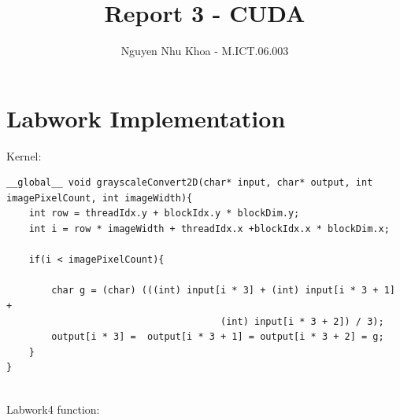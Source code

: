 \documentclass[a4paper,11pt, notitlepage]{article}
\begin{document}
\title{
\vspace{-3cm}
Report 3 - CUDA}
\author{Nguyen Nhu Khoa - M.ICT.06.003}
\maketitle

\pagestyle{plain}
\setcounter{page}{1}

\vspace{-1cm}
\noindent

\section{Labwork Implementation}
Kernel:
\begin{flushleft}
\footnotesize
\begin{BVerbatim}
__global__ void grayscaleConvert2D(char* input, char* output, int imagePixelCount, int imageWidth){
    int row = threadIdx.y + blockIdx.y * blockDim.y;
    int i = row * imageWidth + threadIdx.x +blockIdx.x * blockDim.x;

    if(i < imagePixelCount){

        char g = (char) (((int) input[i * 3] + (int) input[i * 3 + 1] +
                                      (int) input[i * 3 + 2]) / 3);
        output[i * 3] =  output[i * 3 + 1] = output[i * 3 + 2] = g;
    }
}
\end{BVerbatim}
\end{flushleft}
~\\
Labwork4 function:
\end{document}
